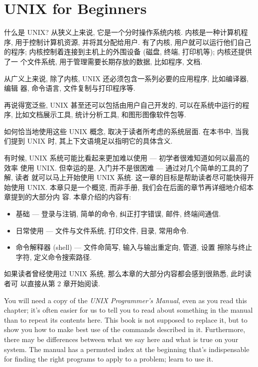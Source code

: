 \chapter{UNIX for Beginners}
\label{chap:unix_for_beginners}

什么是 UNIX? 从狭义上来说, 它是一个分时操作系统内核. 内核是一种计算机程序,
用于控制计算机资源, 并将其分配给用户. 有了内核, 用户就可以运行他们自己的程序;
内核控制着连接到主机上的外围设备 (磁盘, 终端, 打印机等); 内核还提供了一
个文件系统, 用于管理需要长期存放的数据, 比如程序, 文档.

从广义上来说, 除了内核, UNIX 还必须包含一系列必要的应用程序, 比如编译器, 编辑
器, 命令语言, 文件复制与打印程序等.

再说得宽泛些, UNIX 甚至还可以包括由用户自己开发的, 可以在系统中运行的程序,
比如文档展示工具, 统计分析工具, 和图形图像软件包等.

如何恰当地使用这些 UNIX 概念, 取决于读者所考虑的系统层面. 在本书中, 当我们提到
UNIX 时, 其上下文语境足以指明它的具体含义.

有时候, UNIX 系统可能比看起来更加难以使用 --- 初学者很难知道如何以最高的效率
使用 UNIX. 但幸运的是, 入门并不是很困难 --- 通过对几个简单的工具的了解, 读者
就可以马上开始使用 UNIX 系统. 这一章的目标是帮助读者尽可能快得开始使用 UNIX.
本章只是一个概览, 而非手册, 我们会在后面的章节再详细地介绍本章提到的大部分内
容. 本章介绍的内容有:

\begin{itemize}
    \item 基础 --- 登录与注销, 简单的命令, 纠正打字错误, 邮件, 终端间通信.
    \item 日常使用 --- 文件与文件系统, 打印文件, 目录, 常用命令.
    \item 命令解释器 (shell) --- 文件命简写, 输入与输出重定向, 管道, 设置
        擦除与终止字符, 定义命令搜索路径.
\end{itemize}
  
如果读者曾经使用过 UNIX 系统, 那么本章的大部分内容都会感到很熟悉, 此时读者可
以直接从第 2 章开始阅读.

You will need a copy of the \textit{UNIX Programmer's Manual}, even as you read
this chapter; it's often easier for us to tell you to read about something in
the manual than to repeat its contents here. This book is not supposed to
replace it, but to show you how to make best use of the commands described in
it. Furthermore, there may be differences between what we say here and what is
true on your system. The manual has a permuted index at the beginning that's
indispensable for finding the right programs to apply to a problem; learn to use
it.

